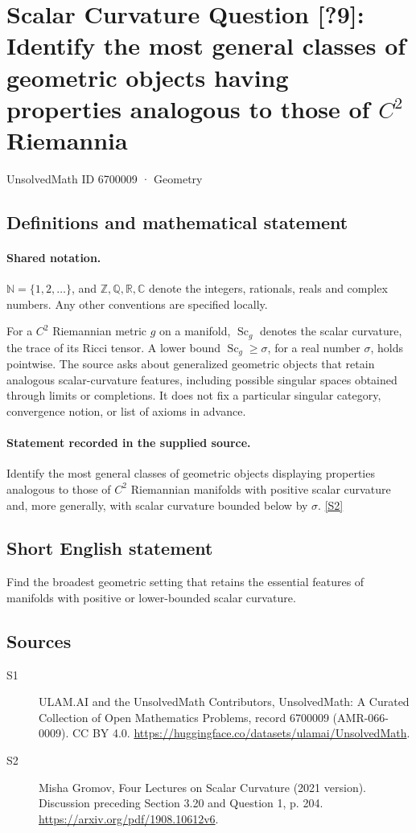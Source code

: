 \documentclass[11pt]{article}
\newcommand{\sref}[2]{\hyperlink{source:#1:#2}{[S#2]}}
\begin{document}
\setcounter{section}{6700008}
\section{Scalar Curvature Question [?9]: Identify the most general classes of geometric objects having properties analogous to those of $C^2$ Riemannia}\label{6700009}
{\small\sffamily UnsolvedMath ID 6700009 · Geometry}
\subsection{Definitions and mathematical statement}

\paragraph{Shared notation.}$\mathbb N=\{1,2,\ldots\}$, and $\mathbb Z,\mathbb Q,\mathbb R,\mathbb C$ denote the integers, rationals, reals and complex numbers. Any other conventions are specified locally.


For a $C^2$ Riemannian metric $g$ on a manifold, $\operatorname{Sc}_g$ denotes the scalar curvature, the trace of its Ricci tensor. A lower bound $\operatorname{Sc}_g\geq\sigma$, for a real number $\sigma$, holds pointwise. The source asks about generalized geometric objects that retain analogous scalar-curvature features, including possible singular spaces obtained through limits or completions. It does not fix a particular singular category, convergence notion, or list of axioms in advance.
\paragraph{Statement recorded in the supplied source.}
Identify the most general classes of geometric objects displaying properties analogous to those of $C^2$ Riemannian manifolds with positive scalar curvature and, more generally, with scalar curvature bounded below by $\sigma$. \sref{6700009}{2}
\subsection{Short English statement}
Find the broadest geometric setting that retains the essential features of manifolds with positive or lower-bounded scalar curvature.
\subsection{Sources}
\begin{description}
\item[\hypertarget{source:6700009:1}{S1}] ULAM.AI and the UnsolvedMath Contributors, UnsolvedMath: A Curated Collection of Open Mathematics Problems, record 6700009 (AMR-066-0009). CC BY 4.0. \url{https://huggingface.co/datasets/ulamai/UnsolvedMath}.
\item[\hypertarget{source:6700009:2}{S2}] Misha Gromov, Four Lectures on Scalar Curvature (2021 version). Discussion preceding Section 3.20 and Question 1, p. 204. \url{https://arxiv.org/pdf/1908.10612v6}.
\end{description}
\label{end:6700009}
\end{document}
